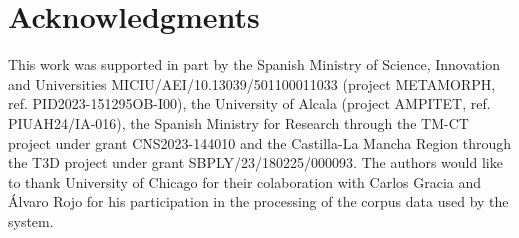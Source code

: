 \documentclass[10pt,onecolumn,letterpaper]{article}
\begin{document}
\section{Acknowledgments}
This work was supported in part by the Spanish Ministry of Science, Innovation and Universities MICIU/AEI/10.13039/501100011033 (project METAMORPH, ref. PID2023-151295OB-I00), the University of Alcala (project AMPITET, ref. PIUAH24/IA-016), the Spanish Ministry for Research through the TM-CT project under grant CNS2023-144010 and the Castilla-La Mancha Region through the T3D project under grant SBPLY/23/180225/000093. The authors would like to thank University of Chicago for their colaboration with Carlos Gracia and Álvaro Rojo for his participation in the processing of the corpus data used by the system.





\end{document}
